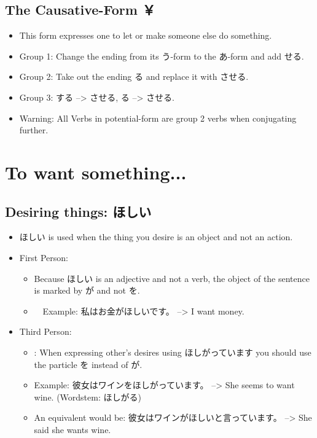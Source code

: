 \documentclass{article}
\newcommand\tabyon[1][0.4cm]{\hspace*{#1}}
\begin{document}
\subsection{The Causative-Form ￥}	
\begin{itemize}
\item This form expresses one to let or make someone else do something.
\item Group 1: Change the ending from its う-form to the あ-form and add せる.
\item Group 2: Take out the ending る and replace it with させる.
\item Group 3: する --> させる, \tabyon {}る --> させる.
\item Warning: All Verbs in potential-form are group 2 verbs when conjugating further.
\end{itemize}
\section{To want something...}
\subsection{Desiring things: ほしい}
\begin{itemize}
\item ほしい is used when the thing you desire is an object and not an action.
\item First Person:
\begin{itemize}
\item Because ほしい is an adjective and not a verb, the object of the sentence is marked by が and not を.
\item　Example: 私はお金がほしいです。 --> I want money.
\end{itemize}
\item Third Person:
\begin{itemize}
\item: When expressing other’s desires using ほしがっています you should use the particle を instead of が.
\item Example: 彼女はワインをほしがっています。	 --> She seems to want wine.	(Wordstem: ほしがる)
\item An equivalent would be: 彼女はワインがほしいと言っています。 --> She said she wants wine.
\end{itemize}
\end{itemize}
\end{document}

